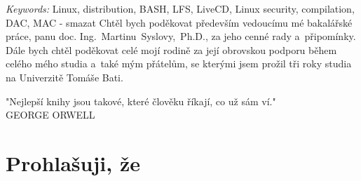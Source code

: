 \documentclass[a4paper,12pt,twoside,BCOR=10mm]{article}
\newcommand{\nmm}[1]{\section*{#1}} %
\begin{document}
\emph{Keywords:} Linux, distribution, BASH, LFS, LiveCD, Linux security, compilation, DAC, MAC
\clearpage
\thispagestyle{empty}
 - smazat
Chtěl bych poděkovat především vedoucímu mé bakalářské práce, panu doc. Ing.~Martinu~Syslovy,~Ph.D., za jeho cenné rady a~připomínky.
Dále bych chtěl poděkovat celé mojí rodině za její obrovskou podporu během celého mého studia a~také mým přátelům, se kterými jsem prožil tři roky studia na Univerzitě Tomáše Bati.

\vspace{3cm}
"Nejlepší knihy jsou takové, které člověku říkají, co už sám ví."\\

\hspace{9cm}GEORGE ORWELL
\clearpage
\thispagestyle{empty}
\clearpage
\nmm{Prohlašuji, že}
\end{document}
